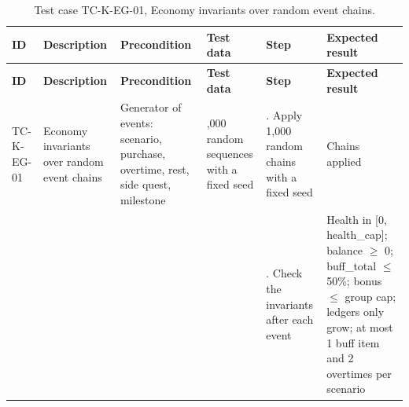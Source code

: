 {\footnotesize{}\renewcommand{\arraystretch}{1.1}
\begin{longtable}{|>{\raggedright\arraybackslash}p{}|>{\raggedright\arraybackslash}p{}|>{\raggedright\arraybackslash}p{}|>{\raggedright\arraybackslash}p{}|>{\raggedright\arraybackslash}p{}|>{\raggedright\arraybackslash}p{}|}
\caption{Test case TC-K-EG-01, Economy invariants over random event chains.} \\
\hline
\textbf{ID} & \textbf{Description} & \textbf{Precondition} & \textbf{Test data} & \textbf{Step} & \textbf{Expected result} \\ \hline
\endfirsthead
\hline
\textbf{ID} & \textbf{Description} & \textbf{Precondition} & \textbf{Test data} & \textbf{Step} & \textbf{Expected result} \\ \hline
\endhead
TC-K-EG-01 & Economy invariants over random event chains & Generator of events: scenario, purchase, overtime, rest, side quest, milestone & 1,000 random sequences with a fixed seed & 1. Apply 1,000 random chains with a fixed seed & Chains applied \\ \cline{5-6}
 &  &  &  & 2. Check the invariants after each event & Health in [0, health\_\allowbreak{}cap]; balance $\geq$ 0; buff\_total $\leq$ 50\%; bonus $\leq$ group cap; ledgers only grow; at most 1 buff item and 2 overtimes per scenario \\ \hline
\end{longtable}
}


